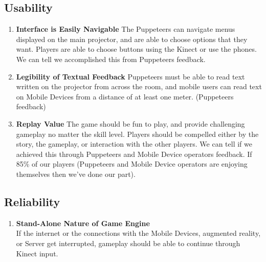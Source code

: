 \documentclass[10pt,letterpaper,oneside,english]{article}
\begin{document}
\subsection{Usability}
\begin{enumerate}
\item \textbf{Interface is Easily Navigable} The Puppeteers can navigate menus displayed on the main projector, and are able to choose options that they want. Players are able to choose buttons using the Kinect or use the phones. We can tell we accomplished this from Puppeteers feedback.
\item \textbf{Legibility of Textual Feedback} Puppeteers must be able to read text written on the projector from across the room, and mobile users can read text on Mobile Devices from a distance of at least one meter. (Puppeteers feedback)
\item \textbf{Replay Value} The game should be fun to play, and provide challenging gameplay no matter the skill level. Players should be compelled either by the story, the gameplay, or interaction with the other players. We can tell if we achieved this through Puppeteers and Mobile Device operators feedback. If 85\% of our players (Puppeteers and Mobile Device operators are enjoying themselves then we’ve done our part).
\end{enumerate}
\subsection{Reliability}
\begin{enumerate}
\item \textbf{Stand-Alone Nature of Game Engine} \\ If the internet or the connections with the Mobile Devices, augmented reality, or Server get interrupted, gameplay should be able to continue through Kinect input.
\end{enumerate}
\end{document}
